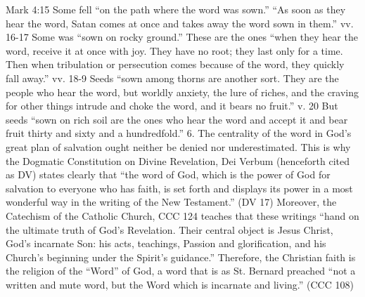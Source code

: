 \documentclass[oneside]{book}
\begin{document}
Mark 4:15
Some fell ``on the path where the word was sown.'' ``As soon as they hear the
word, Satan comes at once and takes away the word sown in them.''
vv. 16-17
Some was ``sown on rocky ground.'' These are the ones ``when they hear the word,
receive it at once with joy. They have no root; they last only for a time. Then
when tribulation or persecution comes because of the word, they quickly fall
away.''
vv. 18-9
Seeds ``sown among thorns are another sort. They are the people who hear the
word, but worldly anxiety, the lure of riches, and the craving for other things
intrude and choke the word, and it bears no fruit.''
v. 20
But seeds ``sown on rich soil are the ones who hear the word and accept it and
bear fruit thirty and sixty and a hundredfold.''
6. The centrality of the word in God's great plan of salvation ought neither be
denied nor underestimated. This is why the Dogmatic Constitution on Divine
Revelation, Dei Verbum (henceforth cited as DV) states clearly that ``the word
of God, which is the power of God for salvation to everyone who has faith, is
set forth and displays its power in a most wonderful way in the writing of the
New Testament.'' (DV 17)
Moreover, the Catechism of the Catholic Church, CCC 124 teaches that these
writings ``hand on the ultimate truth of God's Revelation. Their central object
is Jesus Christ, God's incarnate Son: his acts, teachings, Passion and
glorification, and his Church's beginning under the Spirit's guidance.''
Therefore, the Christian faith is the religion of the ``Word'' of God, a word
that is as St. Bernard preached ``not a written and mute word, but the Word
which is incarnate and living.'' (CCC 108)
\end{document}
